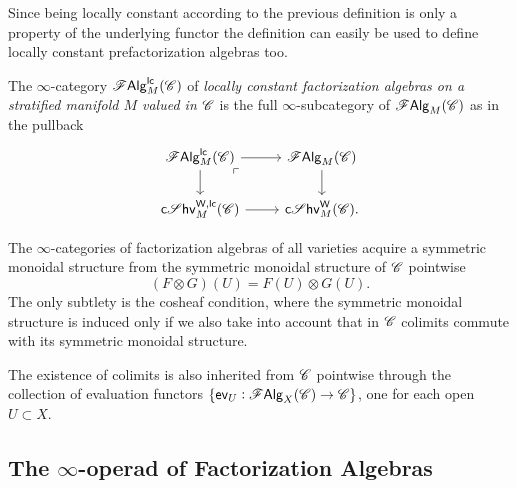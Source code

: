 \documentclass[../text]{subfiles}
\begin{document}
\begin{remark}
    Since being locally constant according to the previous definition is only a property of the underlying functor the definition can easily be used to define locally constant prefactorization algebras too.
\end{remark}

\begin{definition}
    The $\infty$-category $\mathscr{F} \mathsf{Alg}^{\mathsf{lc}}_M (\mathscr{C})$ of \emph{locally constant factorization algebras on a stratified manifold $M$ valued in $\mathscr{C}$} is the full $\infty$-subcategory of $\mathscr{F} \mathsf{Alg}_M (\mathscr{C})$ as in the pullback
    \begin{equation}
        \begin{tikzcd}
            \lcfa_M (\catC) \arrow[dr, phantom, "\ulcorner", very near start] \arrow[r] \arrow[d] & \falg_M (\catC) \arrow[d] \\
            \csheaves[W, lc]_M (\catC) \arrow[r] & \csheaves[W]_M (\catC).
        \end{tikzcd}
    \end{equation}
\end{definition}

\begin{remark}\label{rem:sym_mon_inheritance}
    The $\infty$-categories of factorization algebras of all varieties acquire a symmetric monoidal structure from the symmetric monoidal structure of $\mathscr{C}$ pointwise
    \begin{equation}
        (F \otimes G)(U) = F(U) \otimes G(U).
    \end{equation}
    The only subtlety is the cosheaf condition, where the symmetric monoidal structure is induced only if we also take into account that in $\mathscr{C}$ colimits commute with its symmetric monoidal structure.

    The existence of colimits is also inherited from $\mathscr{C}$ pointwise through the collection of evaluation functors $\{ \mathsf{ev}_U: \mathscr{F} \mathsf{Alg}_X (\mathscr{C}) \rightarrow \mathscr{C} \}$, one for each open $U \subset X$.
\end{remark}



\subsection{The \texorpdfstring{$\infty$-}{infinity }operad of Factorization Algebras}
\end{document}
